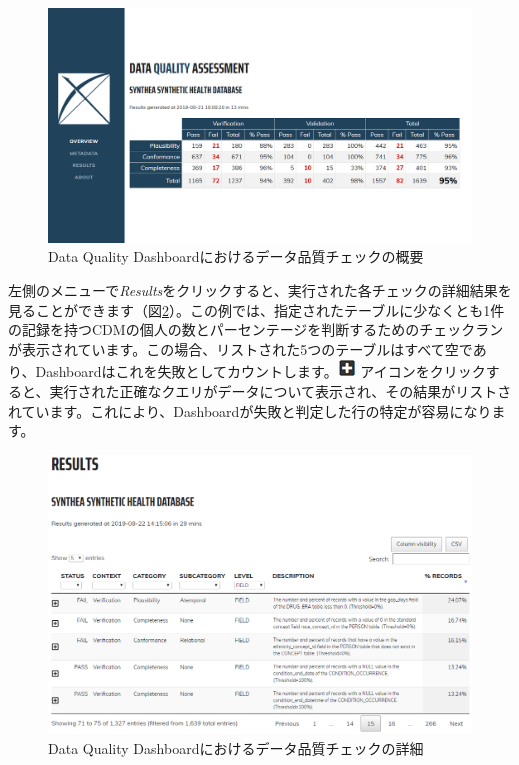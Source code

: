 \documentclass[
  11pt]{book}
\theoremstyle{definition}
\theoremstyle{definition}
\theoremstyle{definition}
\theoremstyle{definition}
\theoremstyle{remark}
\begin{document}
\begin{figure}

{\centering \includegraphics[width=1\linewidth]{images/DataQuality/dqdOverview} 

}

\caption{Data Quality Dashboardにおけるデータ品質チェックの概要}\label{fig:dqdOverview}
\end{figure}

左側のメニューで\emph{Results}をクリックすると、実行された各チェックの詳細結果を見ることができます（図\ref{fig:dqdResults}）。この例では、指定されたテーブルに少なくとも1件の記録を持つCDMの個人の数とパーセンテージを判断するためのチェックランが表示されています。この場合、リストされた5つのテーブルはすべて空であり、Dashboardはこれを失敗としてカウントします。\includegraphics{images/DataQuality/plusIcon.png} アイコンをクリックすると、実行された正確なクエリがデータについて表示され、その結果がリストされています。これにより、Dashboardが失敗と判定した行の特定が容易になります。

\begin{figure}

{\centering \includegraphics[width=1\linewidth]{images/DataQuality/dqdResults} 

}

\caption{Data Quality Dashboardにおけるデータ品質チェックの詳細}\label{fig:dqdResults}
\end{figure}
\end{document}
